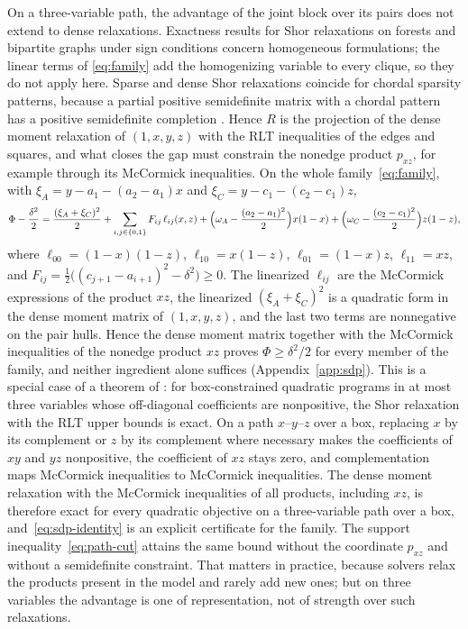 On a three-variable path, the advantage of the joint block over its pairs
does not extend to dense relaxations. Exactness results for Shor relaxations
on forests and bipartite graphs under sign conditions
\citep{SojoudiLavaei2014} concern homogeneous formulations; the linear terms of
\eqref{eq:family} add the homogenizing variable to every clique, so they do not
apply here. Sparse and dense Shor relaxations \citep{Shor1987} coincide
for chordal sparsity patterns, because a partial positive semidefinite
matrix with a chordal pattern has a positive semidefinite completion
\citep{GroneEtAl1984,WakiEtAl2006,Laurent2009}. Hence $R$ is the projection of
the dense moment relaxation of $(1,x,y,z)$ with the RLT inequalities
\citep{SheraliAdams1990,SheraliTuncbilek1992} of the edges and squares, and
what closes the gap must constrain the nonedge product $p_{xz}$, for example
through its McCormick inequalities. On the whole family~\eqref{eq:family}, with
$\xi_A=y-a_1-(a_2-a_1)x$ and $\xi_C=y-c_1-(c_2-c_1)z$,
\begin{equation}\label{eq:sdp-identity}
\Phi-\frac{\delta^2}2=\frac{(\xi_A+\xi_C)^2}2+\sum_{i,j\in\{0,1\}}F_{ij}\,\ell_{ij}(x,z)
+\Bigl(\omega_A-\frac{(a_2-a_1)^2}2\Bigr)x(1-x)+\Bigl(\omega_C-\frac{(c_2-c_1)^2}2\Bigr)z(1-z),
\end{equation}
where $\ell_{00}=(1-x)(1-z)$, $\ell_{10}=x(1-z)$, $\ell_{01}=(1-x)z$,
$\ell_{11}=xz$, and $F_{ij}=\tfrac12\bigl((c_{j+1}-a_{i+1})^2-\delta^2\bigr)\ge0$.
The linearized $\ell_{ij}$ are the McCormick expressions of the product $xz$,
the linearized $(\xi_A+\xi_C)^2$ is a quadratic form in the dense moment matrix
of $(1,x,y,z)$, and the last two terms are nonnegative on the pair hulls.
Hence the dense moment matrix together with the McCormick inequalities of
the nonedge product $xz$ proves $\Phi\ge\delta^2/2$ for every member of the
family, and neither ingredient alone suffices (Appendix~\ref{app:sdp}). This
is a special case of a theorem of \citet[Theorem~1]{BurerNatarajanWillemsen2025}:
for box-constrained quadratic programs in at most three variables whose
off-diagonal coefficients are nonpositive, the Shor relaxation with the RLT
upper bounds is exact. On a path $x$--$y$--$z$ over a box, replacing $x$ by
its complement or $z$ by its complement where necessary makes the
coefficients of $xy$ and $yz$ nonpositive, the coefficient of $xz$ stays zero,
and complementation maps McCormick inequalities to McCormick inequalities.
The dense moment relaxation with the McCormick inequalities of all products,
including $xz$, is therefore exact for every quadratic objective on a
three-variable path over a box, and~\eqref{eq:sdp-identity} is an explicit
certificate for the family. The support inequality~\eqref{eq:path-cut}
attains the same bound without the coordinate $p_{xz}$ and without a
semidefinite constraint. That matters in practice, because solvers relax the
products present in the model and rarely add new ones; but on three variables
the advantage is one of representation, not of strength over such
relaxations.

